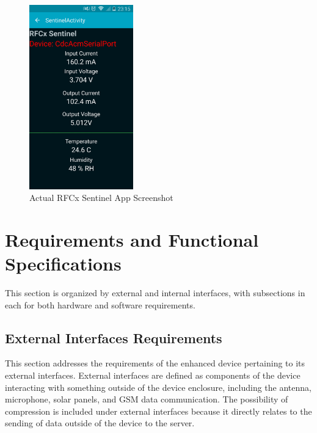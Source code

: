 \documentclass{article}
\numberwithin{figure}{section}
\numberwithin{equation}{section}
\begin{document}
{\begin{figure}[H]
	\centering
	\includegraphics[width=0.4\textwidth]{RFCxSentinelScreenshot}
	\caption{Actual RFCx Sentinel App Screenshot}
	\label{fig:sentscrn}
\end{figure}
\newpage


\section{Requirements and Functional Specifications} \label{sect:requirementsandspec}
This section is organized by external and internal interfaces, with subsections in each for both hardware and software requirements.

\subsection{External Interfaces Requirements} \label{sect:externinterface}
This section addresses the requirements of the enhanced device pertaining to its external interfaces. External interfaces are defined as components of the device interacting with something outside of the device enclosure, including the antenna, microphone, solar panels, and GSM data communication. The possibility of compression is included under external interfaces because it directly relates to the sending of data outside of the device to the server.

}
\end{document}
